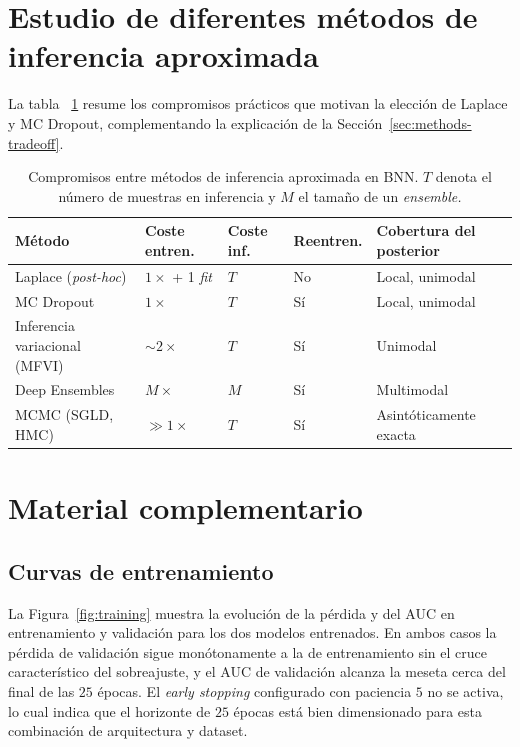 \documentclass{article}
\begin{document}



\appendix

\section{Estudio de diferentes m\'etodos de inferencia aproximada}
\label{sec:appendix-methods}
La tabla ~\ref{tab:methods} resume los compromisos
pr\'acticos que motivan la elecci\'on de Laplace y MC Dropout, complementando la explicaci\'on de la Secci\'on~\ref{sec:methods-tradeoff}.

\begin{table}[h!]
  \caption{Compromisos entre m\'etodos de inferencia aproximada en BNN.
           $T$ denota el n\'umero de muestras en inferencia y $M$ el
           tama\~no de un \textit{ensemble.}}
  \label{tab:methods}
  \centering
  \small
  \begin{tabular}{lllll}
    \toprule
    M\'etodo & Coste entren. & Coste inf. & Reentren. & Cobertura del posterior \\
    \midrule
    Laplace (\emph{post-hoc})      & $1\times$ {\scriptsize + 1 \emph{fit}} & $T$ & No        & Local, unimodal \\
    MC Dropout                     & $1\times$                              & $T$ & S\'i      & Local, unimodal \\
    Inferencia variacional (MFVI)  & $\sim\!2\times$                         & $T$ & S\'i      & Unimodal \\
    Deep Ensembles                 & $M\times$                               & $M$ & S\'i      & Multimodal \\
    MCMC (SGLD, HMC)               & $\gg\!1\times$                          & $T$ & S\'i      & Asint\'oticamente exacta \\
    \bottomrule
  \end{tabular}
\end{table}


\section{Material complementario}
\label{app:supplementary}

\subsection{Curvas de entrenamiento}
\label{app:training}

La Figura~\ref{fig:training} muestra la evoluci\'on de la p\'erdida y
del AUC en entrenamiento y validaci\'on para los dos modelos
entrenados. En ambos casos la p\'erdida de validaci\'on sigue
mon\'otonamente a la de entrenamiento sin el cruce caracter\'istico
del sobreajuste, y el AUC de validaci\'on alcanza la meseta cerca del
final de las $25$ \'epocas. El \emph{early stopping} configurado con
paciencia $5$ no se activa, lo cual indica que el horizonte de $25$
\'epocas est\'a bien dimensionado para esta combinaci\'on de
arquitectura y dataset.
\end{document}
